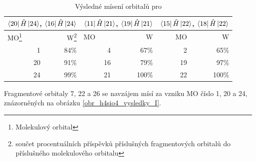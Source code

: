 \documentclass[
  digital, %
  table,   %
  lof,     %
  lot,     %
]{fithesis3}
\begin{document}
\begin{table}[htbp]
\begin{minipage}{\textwidth}
\caption{Výsledné mísení orbitalů pro }
\begin{center}
\begin{tabular}{|r|r|r|r|r|r|}
\hline 
\multicolumn{2}{|c|}{$\bra{20}{\hat{H}}\ket{24}$, $\bra{16}{\hat{H}}\ket{24}$} & \multicolumn{2}{|c|}{$\bra{11}{\hat{H}}\ket{21}$, $\bra{19}{\hat{H}}\ket{21}$}& \multicolumn{2}{|c|}{$\bra{15}{\hat{H}}\ket{22}$, $\bra{18}{\hat{H}}\ket{22}$} \\
\hline \hline
\multicolumn{1}{|l|}{MO\footnote{Molekulový orbital} } & \multicolumn{1}{r|}{W\footnote{součet procentuálních příspěvků příslušných fragmentových orbitalů do příslušného molekulového orbitalu}} & \multicolumn{1}{l|}{MO} & \multicolumn{1}{r|}{W} & MO & \multicolumn{1}{r|}{W} \\ \hline
1 & 84\% & 4 & 67\% & 2 & 65\% \\ \hline
20 & 91\% & 16 & 79\% & 19 & 97\% \\ \hline
24 & 99\% & 21 & 100\% &  22& 100\% \\ \hline
\end{tabular}
\end{center}
\label{tab_h4sio4_vysledky}
\end{minipage}
\end{table}
    Fragmentové orbitaly 7, 22 a 26 se navzájem mísí za vzniku MO číslo 1, 20 a 24, znázorněných na obrázku \ref{obr_h4sio4_vysledky_I}.
\end{document}
